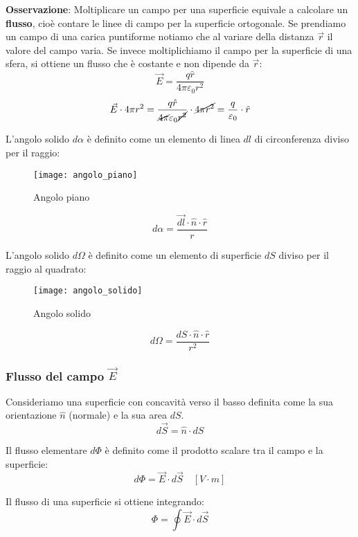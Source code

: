 \documentclass[a4paper]{article}
\begin{document}
\vspace{1em}
\noindent
\textbf{Osservazione}: Moltiplicare un campo per una superficie equivale a calcolare un
\textbf{flusso}, cioè contare le linee di campo per la superficie ortogonale. Se prendiamo
un campo di una carica puntiforme notiamo che al variare della distanza \( \vec{r} \) 
il valore del campo varia. Se invece moltiplichiamo il campo per la superficie di una 
sfera, si ottiene un flusso che è costante e non dipende da \( \vec{r} \):
\[
  \vec{E} = \frac{q \hat{r}}{4 \pi \varepsilon_0 r^2}
\] 
\[
  \vec{E} \cdot 4 \pi r^2 = \frac{q \hat{r}}{\cancel{4 \pi} \varepsilon_0 \cancel{r^2}}
  \cdot \cancel{4 \pi r^2} = \frac{q}{\varepsilon_0} \cdot \hat{r}
\] 

\begin{define}
  L'angolo solido \( d \alpha \) è definito come un elemento di linea \( dl \) di 
  circonferenza diviso per il raggio:
  \begin{figure}[H]
    \centering
    \texttt{[image: angolo\_piano]}
    \caption{Angolo piano}
  \end{figure}
  \[
    d \alpha = \frac{\vec{dl} \cdot \hat{n} \cdot \hat{r}}{r}
  \] 
\end{define}
\begin{define}
  L'angolo solido \( d \Omega \) è definito come un elemento di superficie \( dS \) diviso
  per il raggio al quadrato:
  \begin{figure}[H]
    \centering
    \texttt{[image: angolo\_solido]}
    \caption{Angolo solido}
  \end{figure}
  \[
    d \Omega = \frac{dS \cdot \hat{n} \cdot \hat{r}}{r^2}
  \]
  
\end{define}

\subsubsection{Flusso del campo \texorpdfstring{\( \vec{E} \)}{E}}
Consideriamo una superficie con concavità verso il basso definita come la sua orientazione
\( \hat{n} \) (normale) e la sua area \( dS \).
\label{14-03-D3}
\[
  d\vec{S} = \hat{n} \cdot dS
\] 
\begin{definition}
  Il flusso elementare \( d \Phi \) è definito come il prodotto scalare tra il campo
  e la superficie:
  \[
    d \Phi = \vec{E} \cdot d \vec{S} \quad \left[ V \cdot m \right]
  \] 

  \vspace{1em}
  \noindent
  Il flusso di una superficie si ottiene integrando:
  \[
    \Phi = \oint \vec{E} \cdot d \vec{S}
  \] 
\end{definition}
\end{document}
